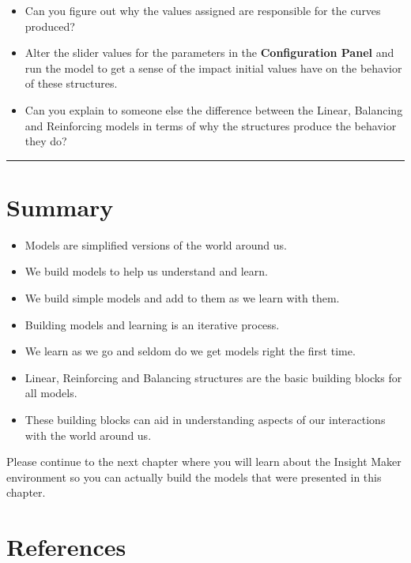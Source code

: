 \documentclass[]{memoir}
\renewcommand{\u}[1]{\textbf{#1}}
\begin{document}
\begin{itemize}
\itemsep1pt\parskip0pt
\item
  Can you figure out why the values assigned are responsible for the
  curves produced?
\item
  Alter the slider values for the parameters in the
  \u{Configuration Panel} and run the model to get a sense of the impact
  initial values have on the behavior of these structures.
\item
  Can you explain to someone else the difference between the Linear,
  Balancing and Reinforcing models in terms of why the structures
  produce the behavior they do?
\end{itemize}

\begin{center}\rule{3in}{0.4pt}\end{center}

\section{Summary}

\begin{itemize}
\itemsep1pt\parskip0pt
\item
  Models are simplified versions of the world around us.
\item
  We build models to help us understand and learn.
\item
  We build simple models and add to them as we learn with them.
\item
  Building models and learning is an iterative process.
\item
  We learn as we go and seldom do we get models right the first time.
\item
  Linear, Reinforcing and Balancing structures are the basic building
  blocks for all models.
\item
  These building blocks can aid in understanding aspects of our
  interactions with the world around us.
\end{itemize}

Please continue to the next chapter where you will learn about the
Insight Maker environment so you can actually build the models that were
presented in this chapter.

\section{References}
\end{document}
